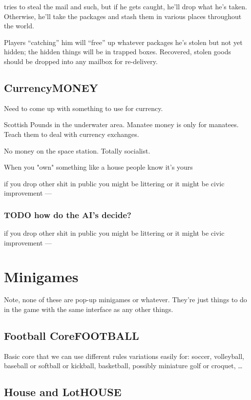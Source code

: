 \documentclass[11pt]{article}
\begin{document}
tries to steal the mail and such, but if he gets caught, he'll drop
what he's taken. Otherwise, he'll take the packages and stash them in
various places throughout the world.

Players “catching” him will “free” up whatever packages he's stolen
but not yet hidden; the hidden things will be in trapped boxes.
Recovered, stolen goods should be dropped into any mailbox for
re-delivery.
\subsection{Currency\hfill{}\textsc{MONEY}}
\label{sec-2-4}

Need to come up with something to use for currency.

Scottish Pounds in the underwater area. Manatee money is only for
manatees. Teach them to deal with currency exchanges.

No money on the space station. Totally socialist.

When you "own" something like a house people know it's yours

if you drop other shit in public you might be littering or it might be
civic improvement —

\subsubsection{{\bfseries\sffamily TODO} how do the AI's decide?}
\label{sec-2-4-1}

if you drop other shit in public you might be littering or it might be
civic improvement —
\section{Minigames}
\label{sec-3}

Note, none of these are pop-up minigames or whatever. They're just
things to do in the game with the same interface as any other things.

\subsection{Football Core\hfill{}\textsc{FOOTBALL}}
\label{sec-3-1}

Basic  core that  we can  use different  rules variations  easily for:
soccer,  volleyball, baseball  or  softball  or kickball,  basketball,
possibly miniature golf or croquet, …
\subsection{House and Lot\hfill{}\textsc{HOUSE}}
\label{sec-3-2}
\end{document}
